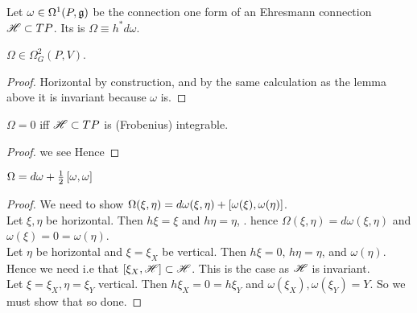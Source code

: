 \documentclass{article}
\begin{document}
\begin{definition}
Let $\omega \in \Omega^1(P,\mf{g})$ be the connection one form of an Ehresmann connection $\ms{H} \subset TP$. Its  is $\Omega \equiv h^\ast d\omega$. 
\end{definition}

\begin{lemma}
$\Omega \in \Omega^2_G(P,V)$. 
\end{lemma}
\begin{proof}
Horizontal by construction, and by the same calculation as the lemma above it is invariant because $\omega$ is. 
\end{proof}

\begin{prop}
$\Omega=0$ iff $\ms{H} \subset TP$ is (Frobenius) integrable.  
\end{prop}
\begin{proof}
we see
Hence 
\end{proof}

\begin{prop}
$\Omega = d\omega + \frac{1}{2}\comm[\omega]{\omega}$
\end{prop}
\begin{proof}
We need to show $\Omega(\xi,\eta) = d\omega(\xi,\eta) + \comm[\omega(\xi)]{\omega(\eta)}$. \\
Let $\xi, \eta$ be horizontal. Then $h\xi = \xi$ and $h\eta =\eta$, . hence $\Omega(\xi,\eta) = d\omega(\xi,\eta)$ and $\omega(\xi) = 0 = \omega(\eta)$. \\
Let $\eta$ be horizontal and $\xi = \xi_X$ be vertical. Then $h\xi=0$, $h\eta = \eta$, and $\omega(\eta)$. Hence we need 
i.e that $\comm[\xi_X]{\ms{H}} \subset \ms{H}$. This is the case as $\ms{H}$ is invariant. \\
Let $\xi=\xi_X, \eta = \xi_Y$ vertical. Then $h\xi_X = 0 = h\xi_Y$ and $\omega(\xi_X), \omega(\xi_Y) = Y$. So we must show that 
so done. 
\end{proof}
\end{document}
